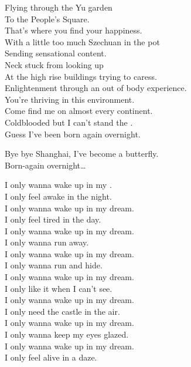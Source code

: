 
Flying through the Yu garden \\
To the People's Square. \\
That's where you find your happiness. \\
With a little too much Szechuan in the pot \\
Sending sensational content. \\
Neck stuck from looking up \\
At the high rise buildings trying to caress. \\
Enlightenment through an out of body experience. \\
You're thriving in this environment. \\
Come find me on almost every continent. \\
Coldblooded but I can't stand the . \\
Guess I've been born again overnight. \\


Bye bye Shanghai, I've become a butterfly. \\
Born-again overnight… \\





I only wanna wake up in my . \\
I only feel awake in the night. \\
I only wanna wake up in my dream. \\
I only feel tired in the day. \\
I only wanna wake up in my dream. \\
I only wanna run away. \\
I only wanna wake up in my dream. \\
I only wanna run and hide. \\
I only wanna wake up in my dream. \\
I only like it when I can't see. \\
I only wanna wake up in my dream. \\
I only need the castle in the air. \\
I only wanna wake up in my dream. \\
I only wanna keep my eyes glazed. \\
I only wanna wake up in my dream. \\
I only feel alive in a daze. \\

